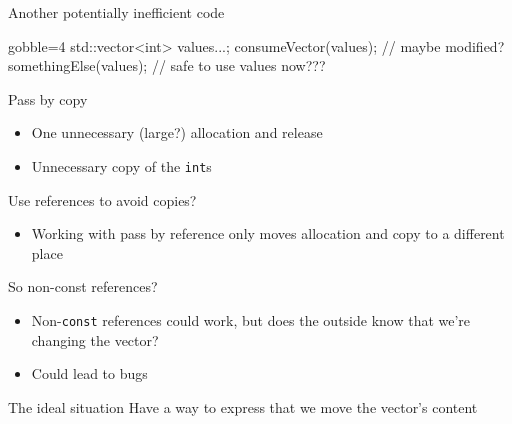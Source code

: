 \begin{frame}[fragile]
\begin{exampleblock}{Another potentially inefficient code}
\begin{overprint}
\begin{cppcode*}{gobble=4}
        std::vector<int> values{...};
        consumeVector(values); // maybe modified?
        somethingElse(values); // safe to use values now???
      \end{cppcode*}
    \end{overprint}
  \end{exampleblock}
  \begin{overprint}
    \begin{alertblock}{Pass by copy}
      \begin{itemize}
      \item One unnecessary (large?) allocation and release
      \item Unnecessary copy of the \texttt{int}s
      \end{itemize}
    \end{alertblock}
    \begin{alertblock}{Use references to avoid copies?}
      \begin{itemize}
      \item Working with pass by reference only moves allocation and copy to a different place
      \end{itemize}
    \end{alertblock}
    \begin{alertblock}{So non-const references?}
      \begin{itemize}
      \item Non-\texttt{const} references could work, but does the outside know that we're changing the vector?
      \item Could lead to bugs
      \end{itemize}
    \end{alertblock}
    \begin{block}{The ideal situation}
      Have a way to express that we move the vector's content
    \end{block}
  \end{overprint}
\end{frame}

